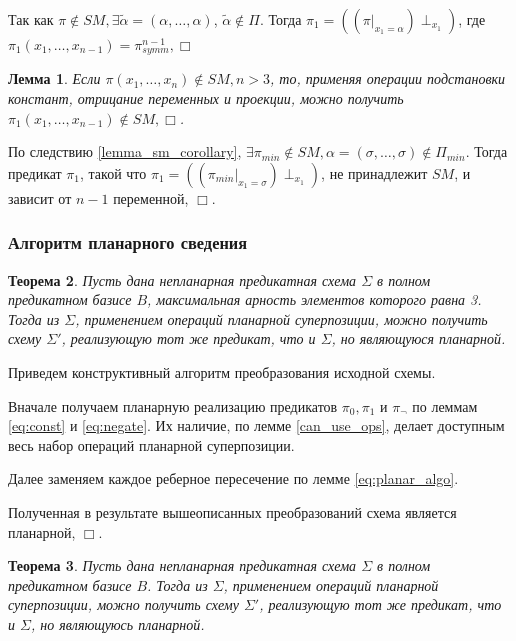 \documentclass[12pt]{article}
\newtheorem{theorem}{Теорема}[section]
\newtheorem{lemma}[theorem]{Лемма}
\newenvironment{proof}[1][Доказательство]{\begin{trivlist}
\item[\hskip \labelsep {\bfseries #1}]}{\end{trivlist}}
\begin{document}
\begin{proof}
Так как 
$\pi \notin SM, \exists \widetilde{\alpha} = (\alpha, \dots, \alpha)$, $\widetilde{\alpha} \notin \Pi$.
Тогда 
$\pi_1 = ( (\pi|_{x_1=\alpha}) \perp_{x_1} )$, где $\pi_1(x_1, \dots, x_{n-1}) = \pi_{symm}^{n-1}, \Box$
\end{proof}

\begin{lemma}
\label{eq:svedenie2}
Если $\pi(x_1, \dots, x_n) \notin SM, n > 3$, то, применяя операции подстановки констант, отрицание переменных и 
проекции, можно получить $\pi_1(x_1, \dots, x_{n-1}) \notin SM, \Box$.
\end{lemma}

\begin{proof}
По следствию \ref{lemma_sm_corollary}, 
$\exists \pi_{min} \notin SM, \alpha=(\sigma, \dots, \sigma) \notin \Pi_{min}$. Тогда предикат $\pi_1$, такой что
$\pi_1 = ( (\pi_{min}|_{x_1=\sigma}) \perp_{x_1} )$, не принадлежит $SM$, и зависит от $n-1$ переменной, $\Box$.
\end{proof}

\subsubsection{Алгоритм планарного сведения}

\begin{theorem}
\label{Theo1}
Пусть дана непланарная предикатная схема $\Sigma$ в полном предикатном базисе $B$, максимальная
арность элементов которого равна 3.
Тогда из $\Sigma$, применением операций планарной суперпозиции, можно получить схему $\Sigma'$,
реализующую тот же предикат, что и $\Sigma$, но являющуюся планарной.
\end{theorem}
\begin{proof}
Приведем конструктивный алгоритм преобразования исходной схемы.

Вначале получаем планарную реализацию предикатов $\pi_0, \pi_1$ и $\pi_{\neg}$ 
по леммам \ref{eq:const} и \ref{eq:negate}. Их наличие, по лемме \ref{can_use_ops},
делает доступным весь набор операций планарной суперпозиции. 

Далее заменяем каждое реберное пересечение по лемме \ref{eq:planar_algo}. 

Полученная в результате вышеописанных преобразований схема является планарной, $\Box$.
\end{proof}

\begin{theorem}
\label{Theo2}
Пусть дана непланарная предикатная схема $\Sigma$ в полном предикатном базисе $B$. 
Тогда из $\Sigma$, применением операций планарной суперпозиции, можно получить схему $\Sigma'$,
реализующую тот же предикат, что и $\Sigma$, но являющуюсь планарной.
\end{theorem}
\end{document}
